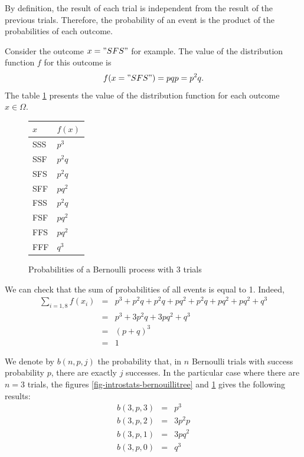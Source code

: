 By definition, the result of each trial is independent from the result of 
the previous trials. Therefore, the 
probability of an event is the product of the probabilities of each 
outcome. 

Consider the outcome $x="SFS"$ for example. The value of the 
distribution function $f$ for this outcome is
\begin{eqnarray}
f(x="SFS") = pqp = p^2q.
\end{eqnarray}
The table \ref{fig-introstats-probabernouilli} presents the value of the distribution function
for each outcome $x\in \Omega$.

\begin{figure}
\begin{center}
\begin{tabular}{|ll|}
\hline
$x$ & $f(x)$\\
\hline
SSS & $p^3$\\
SSF & $p^2 q$\\
SFS & $p^2 q$\\
SFF & $p q^2$\\
FSS & $p^2 q$\\
FSF & $p q^2$\\
FFS & $p q^2$\\
FFF & $q^3$\\
\hline
\end{tabular}
\end{center}
\caption{Probabilities of a Bernoulli process with 3 trials}
\label{fig-introstats-probabernouilli}
\end{figure}

We can check that the sum of probabilities of all events is equal to 1.
Indeed, 
\begin{eqnarray}
\sum_{i=1,8} f(x_i)&=& p^3 + p^2 q + p^2 q + p q^2 + p^2 q + p q^2 + p q^2 + q^3\\
&=& p^3 + 3 p^2 q + 3 p q^2 + q^3\\
&=& ( p + q )^3\\
&=& 1
\end{eqnarray}

We denote by $b(n,p,j)$ the probability that, in $n$ Bernoulli trials with 
success probability $p$, there are exactly $j$ successes. 
In the particular case where there are $n=3$ trials, the figures \ref{fig-introstats-bernouillitree}
and \ref{fig-introstats-probabernouilli}
gives the following results:
\begin{eqnarray}
b(3,p,3) &=& p^3\\
b(3,p,2) &=& 3 p^2 p\\
b(3,p,1) &=& 3 p q^2\\
b(3,p,0) &=& q^3
\end{eqnarray}

